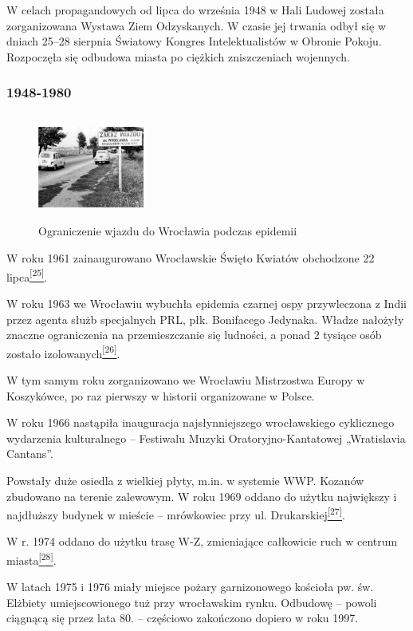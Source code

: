 \documentclass{article}
\begin{document}
W celach propagandowych od lipca do września 1948 w Hali Ludowej została zorganizowana Wystawa Ziem Odzyskanych. W czasie jej trwania odbył się w dniach 25–28 sierpnia Światowy Kongres Intelektualistów w Obronie Pokoju. Rozpoczęła się odbudowa miasta po ciężkich zniszczeniach wojennych.

\subsubsection{1948-1980}

\begin{figure}
\includegraphics[width=3.5cm, height=3.5cm]{images/Zdjecie18.png}
\caption{Ograniczenie wjazdu do Wrocławia podczas epidemii}
\end{figure}

W roku 1961 zainaugurowano Wrocławskie Święto Kwiatów obchodzone 22 lipca\hyperlink{25}{\textsuperscript{[25]}}.

W roku 1963 we Wrocławiu wybuchła epidemia czarnej ospy przywleczona z Indii przez agenta służb specjalnych PRL, płk. Bonifacego Jedynaka. Władze nałożyły znaczne ograniczenia na przemieszczanie się ludności, a ponad 2 tysiące osób zostało izolowanych\hyperlink{26}{\textsuperscript{[26]}}.

W tym samym roku zorganizowano we Wrocławiu Mistrzostwa Europy w Koszykówce, po raz pierwszy w historii organizowane w Polsce.

W roku 1966 nastąpiła inauguracja najsłynniejszego wrocławskiego cyklicznego wydarzenia kulturalnego – Festiwalu Muzyki Oratoryjno-Kantatowej „Wratislavia Cantans”.

Powstały duże osiedla z wielkiej płyty, m.in. w systemie WWP. Kozanów zbudowano na terenie zalewowym. W roku 1969 oddano do użytku największy i najdłuższy budynek w mieście – mrówkowiec przy ul. Drukarskiej\hyperlink{27}{\textsuperscript{[27]}}.

W r. 1974 oddano do użytku trasę W-Z, zmieniające całkowicie ruch w centrum miasta\hyperlink{28}{\textsuperscript{[28]}}.

W latach 1975 i 1976 miały miejsce pożary garnizonowego kościoła pw. św. Elżbiety umiejscowionego tuż przy wrocławskim rynku. Odbudowę – powoli ciągnącą się przez lata 80. – częściowo zakończono dopiero w roku 1997.
\end{document}
